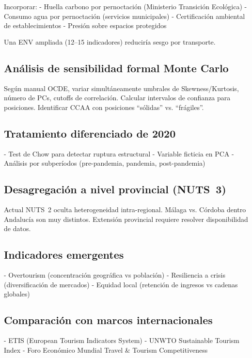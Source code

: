 Incorporar:
- Huella carbono por pernoctación (Ministerio Transición Ecológica)
- Consumo agua por pernoctación (servicios municipales)
- Certificación ambiental de establecimientos
- Presión sobre espacios protegidos

Una ENV ampliada (12--15 indicadores) reduciría sesgo por transporte.

\subsection{Análisis de sensibilidad formal Monte Carlo}

Según manual OCDE, variar simultáneamente umbrales de Skewness/Kurtosis, número de PCs, cutoffs de correlación. Calcular intervalos de confianza para posiciones. Identificar CCAA con posiciones ``sólidas'' vs. ``frágiles''.

\subsection{Tratamiento diferenciado de 2020}

- Test de Chow para detectar ruptura estructural
- Variable ficticia en PCA
- Análisis por subperíodos (pre-pandemia, pandemia, post-pandemia)

\subsection{Desagregación a nivel provincial (NUTS~3)}

Actual NUTS~2 oculta heterogeneidad intra-regional. Málaga vs. Córdoba dentro Andalucía son muy distintos. Extensión provincial requiere resolver disponibilidad de datos.

\subsection{Indicadores emergentes}

- Overtourism (concentración geográfica vs población)
- Resiliencia a crisis (diversificación de mercados)
- Equidad local (retención de ingresos vs cadenas globales)

\subsection{Comparación con marcos internacionales}

- ETIS (European Tourism Indicators System)
- UNWTO Sustainable Tourism Index
- Foro Económico Mundial Travel & Tourism Competitiveness

